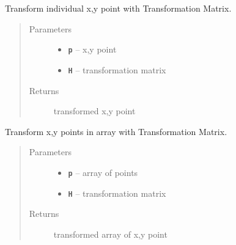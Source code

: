 \documentclass[letterpaper,10pt,english]{sphinxmanual}
\begin{document}
\begin{fulllineitems}
\label{RRtoolbox.lib.arrayops:RRtoolbox.lib.arrayops.basic.transformPoint}
Transform individual x,y point with Transformation Matrix.
\begin{quote}\begin{description}
\item[{Parameters}] \leavevmode\begin{itemize}
\item {} 
\textbf{\texttt{p}} -- x,y point

\item {} 
\textbf{\texttt{H}} -- transformation matrix

\end{itemize}

\item[{Returns}] \leavevmode
transformed x,y point

\end{description}\end{quote}

\end{fulllineitems}


\begin{fulllineitems}
\label{RRtoolbox.lib.arrayops:RRtoolbox.lib.arrayops.basic.transformPoints}
Transform x,y points in array with Transformation Matrix.
\begin{quote}\begin{description}
\item[{Parameters}] \leavevmode\begin{itemize}
\item {} 
\textbf{\texttt{p}} -- array of points

\item {} 
\textbf{\texttt{H}} -- transformation matrix

\end{itemize}

\item[{Returns}] \leavevmode
transformed array of x,y point

\end{description}\end{quote}

\end{fulllineitems}
\end{document}
